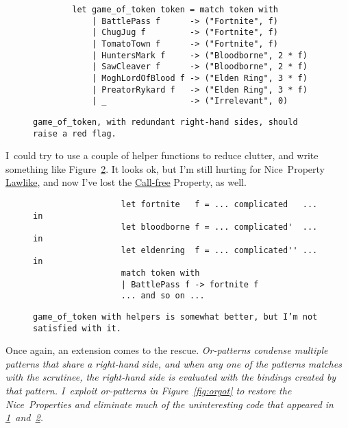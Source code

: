 \documentclass[manuscript,screen,review, 12pt, nonacm]{acmart}
\begin{document}
        \begin{figure}
            \begin{center}
                \begin{verbatim}
        let game_of_token token = match token with 
            | BattlePass f      -> ("Fortnite", f)
            | ChugJug f         -> ("Fortnite", f)
            | TomatoTown f      -> ("Fortnite", f)
            | HuntersMark f     -> ("Bloodborne", 2 * f)
            | SawCleaver f      -> ("Bloodborne", 2 * f)
            | MoghLordOfBlood f -> ("Elden Ring", 3 * f)
            | PreatorRykard f   -> ("Elden Ring", 3 * f)
            | _                 -> ("Irrelevant", 0)
                \end{verbatim}
            \end{center}    

        \caption{\tt{game\_of\_token}, with redundant right-hand sides,
        should raise a red flag.} 
        \label{fig:baregot}
        \end{figure}

        I~could try to use a couple of helper functions to reduce clutter, and
        write something like Figure~\ref{fig:helpergot}. It looks ok, but I'm
        still hurting for Nice~Property \hyperref[p2]{Lawlike}, and now I've
        lost the \hyperref[p3]{Call-free} Property, as well.

        \begin{figure}
            \begin{center}
                \begin{verbatim}
                  let fortnite   f = ... complicated   ... in
                  let bloodborne f = ... complicated'  ... in
                  let eldenring  f = ... complicated'' ... in
                  match token with
                  | BattlePass f -> fortnite f
                  ... and so on ...                
                \end{verbatim}
            \end{center}    
        \caption{\tt{game\_of\_token} with helpers is somewhat better, but I'm
        not satisfied with it.} 
        \label{fig:helpergot}
        \end{figure}

        Once again, an extension comes to the rescue. \it{Or-patterns} condense
        multiple patterns that share a right-hand side, and when any one of the
        patterns matches with the scrutinee, the right-hand side is evaluated
        with the bindings created by that pattern. I~exploit or-patterns in
        Figure~\ref{fig:orgot} to restore the Nice~Properties and eliminate much
        of the uninteresting code that appeared in
        \ref{fig:baregot}~and~\ref{fig:helpergot}. 
\end{document}
